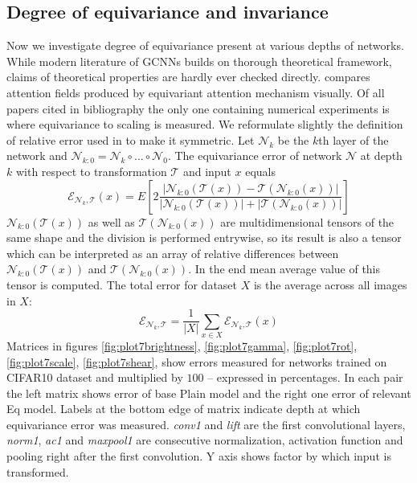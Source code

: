\subsection{Degree of equivariance and invariance}
    \label{sec:exp_eq}
    \newcommand{\mcn}{\mathcal{N}}
    \newcommand{\mct}{\mathcal{T}}
    Now we investigate degree of equivariance present at
    various depths of networks. While modern literature of GCNNs builds on
    thorough theoretical framework, claims of theoretical properties are hardly
    ever checked directly. \cite{attentive_gcnn} compares attention fields
    produced by equivariant attention mechanism visually.
    Of all papers cited in bibliography the only one containing numerical
    experiments is
    \cite{scale_steerable} where equivariance to scaling is measured.
    We reformulate slightly the definition of relative error used in
    \cite{scale_steerable} to make it symmetric.
    Let $\mcn_k$ be the $k$th layer of
    the network and $\mcn_{k:0} = \mcn_k \circ \dots \circ \mcn_0$. The
    equivariance error of network $\mcn$
    at depth $k$ with respect to transformation $\mathcal{T}$
    and input $x$ equals
    $$ \mathcal{E}_{\mcn_k,\mct}(x) = E\left[2\frac{\left|\mcn_{k:0}\left(\mct(x)\right) -
    \mct(\mcn_{k:0}(x))\right|}
{\left|\mcn_{k:0}(\mct(x))\right| + \left|\mct(\mcn_{k:0}(x))\right|}\right] $$
    $\mcn_{k:0}\left(\mct(x)\right)$ as well as
    $\mct(\mcn_{k:0}(x))$ are multidimensional tensors of the same shape
    and the division is performed entrywise, so its result is also a
    tensor which can be interpreted as an array of relative
    differences between
    $\mcn_{k:0}\left(\mct(x)\right)$ and
    $\mct(\mcn_{k:0}(x))$. In the end mean average value of this tensor is computed.
    The total error for dataset $X$ is the average across all images in $X$:
    $$ \mathcal{E}_{\mcn_k,\mct} = \frac{1}{|X|}\sum_{x \in X }\mathcal{E}_{\mcn_k,\mct}(x) $$
    Matrices in figures
    \ref{fig:plot7brightness},
    \ref{fig:plot7gamma},
    \ref{fig:plot7rot},
    \ref{fig:plot7scale},
    \ref{fig:plot7shear},
    show errors measured for networks trained on CIFAR10 dataset and multiplied
    by $100$ -- expressed in percentages.
    In each pair the left matrix shows error of base Plain model and the right one
    error of relevant Eq model. Labels at the bottom edge of
    matrix indicate depth at which equivariance error was measured.
    \textit{conv1} and \textit{lift} are the first convolutional layers,
    \textit{norm1}, \textit{ac1} and \textit{maxpool1} are consecutive
    normalization, activation function and pooling right after the first
    convolution. Y axis shows factor by which input is transformed.

